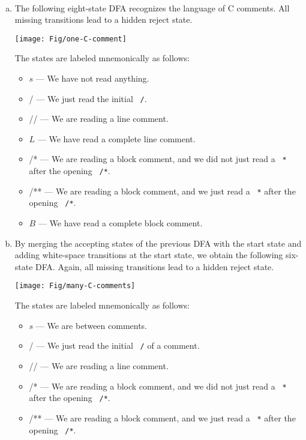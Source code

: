 \documentclass[11pt]{article}
\def\Sym#1{\texttt{\upshape \color{BrickRed} {#1}}}
\begin{document}
\begin{enumerate}
\newpage
\begin{solution}~
\begin{enumerate}[(a)]
\item
The following eight-state DFA recognizes the language of C comments.  All missing transitions lead to a hidden reject state.
\begin{center}
\texttt{[image: Fig/one-C-comment]}
\end{center}
The states are labeled mnemonically as follows:
\begin{itemize}
\item $s$ — We have not read anything.
\item / — We just read the initial \Sym/.
\item // — We are reading a line comment.
\item $L$ — We have read a complete line comment.
\item /* — We are reading a block comment, and we did not just read a \Sym* after the opening \Sym{/*}. 
\item /** — We are reading a block comment, and we just read a \Sym* after the opening \Sym{/*}. 
\item $B$ — We have read a complete block comment. 
\end{itemize}

\bigskip\bigskip
\item
By merging the accepting states of the previous DFA with the start state and adding white-space transitions at the start state, we obtain the following six-state DFA.  Again, all missing transitions lead to a hidden reject state.
\begin{center}
\texttt{[image: Fig/many-C-comments]}
\end{center}
The states are labeled mnemonically as follows:
\begin{itemize}
\item $s$ — We are between comments.
\item / — We just read the initial \Sym/ of a comment.
\item // — We are reading a line comment.
\item /* — We are reading a block comment, and we did not just read a \Sym* after the opening \Sym{/*}. 
\item /** — We are reading a block comment, and we just read a \Sym* after the opening \Sym{/*}. 
\end{itemize}
\end{enumerate}
\end{solution}


\end{enumerate}
\end{document}
